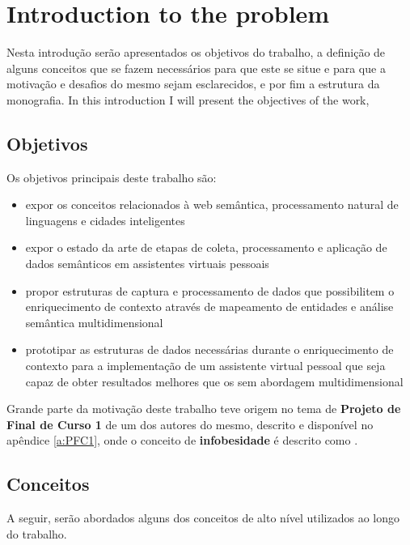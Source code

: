 \chapter{Introduction to the problem} \label{c:introducao_ao_problema}

Nesta introdução serão apresentados os objetivos do trabalho, a definição de alguns conceitos que se fazem necessários para que este se situe e para que a motivação e desafios do mesmo sejam esclarecidos, e por fim a estrutura da monografia.
In this introduction I will present the objectives of the work, 

\section{Objetivos} \label{s:objetivos}

Os objetivos principais deste trabalho são:

\begin{itemize}
    \item expor os conceitos relacionados à web semântica, processamento natural de linguagens e cidades inteligentes
    \item expor o estado da arte de etapas de coleta, processamento e aplicação de dados semânticos em assistentes virtuais pessoais
    \item propor estruturas de captura e processamento de dados que possibilitem o enriquecimento de contexto através de mapeamento de entidades e análise semântica multidimensional
    \item prototipar as estruturas de dados necessárias durante o enriquecimento de contexto para a implementação de um assistente virtual pessoal que seja capaz de obter resultados melhores que os sem abordagem multidimensional
\end{itemize}

Grande parte da motivação deste trabalho teve origem no tema de \textbf{Projeto de Final de Curso 1} de um dos autores do mesmo, descrito e disponível no apêndice \ref{a:PFC1}, onde o conceito de \textbf{infobesidade} é descrito como .

\section{Conceitos} \label{s:conceitos}

A seguir, serão abordados alguns dos conceitos de alto nível utilizados ao longo do trabalho.

